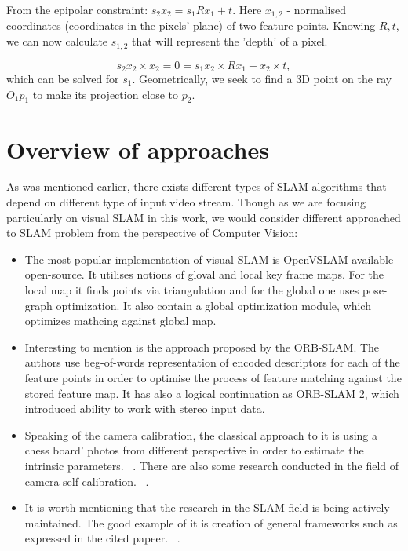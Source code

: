 From the epipolar constraint: $s_{2} x_{2} = s_{1} R x_{1} + t$. Here $x_{1, 2}$ - normalised coordinates (coordinates in the pixels' plane) of two feature points. Knowing $R, t$, we can now calculate $s_{1, 2}$ that will represent the 'depth' of a pixel. 

\begin{equation}
    s_{2} x_{2} \times x_{2} = 0 = s_{1} x_{2} \times R x_{1} + x_{2} \times t,
\end{equation}
which can be solved for $s_{1}$. Geometrically, we seek to find a 3D point on the ray $O_{1}p_{1}$ to make its projection close to $p_{2}$.
\pagebreak

\section{Overview of approaches}
As was mentioned earlier, there exists different types of SLAM algorithms that depend on different type of input video stream. Though as we are focusing particularly on visual SLAM in this work, we would consider different approached to SLAM problem from the perspective of Computer Vision:

\begin{itemize}
    \item The most popular implementation of visual SLAM is OpenVSLAM available open-source. It utilises notions of gloval and local key frame maps. For the local map it finds points via triangulation and for the global one uses pose-graph optimization. It also contain a global optimization module, which optimizes mathcing against global map. ~\cite{OpenVSLAM}
    \item Interesting to mention is the approach proposed by the ORB-SLAM. The authors use beg-of-words representation of encoded descriptors for each of the feature points in order to optimise the process of feature matching against the stored feature map. It has also a logical continuation as ORB-SLAM 2, which introduced ability to work with stereo input data. ~\cite{ORB_SLAM}
    \item Speaking of the camera calibration, the classical approach to it is using a chess board' photos from different perspective in order to estimate the intrinsic parameters. ~\cite{Camera_Calibration}. There are also some research conducted in the field of camera self-calibration. ~\cite{Self_Calibration}.
    \item It is worth mentioning that the research in the SLAM field is being actively maintained. The good example of it is creation of general frameworks such as expressed in the cited papeer. ~\cite{GeneralFramework}.
\end{itemize}

